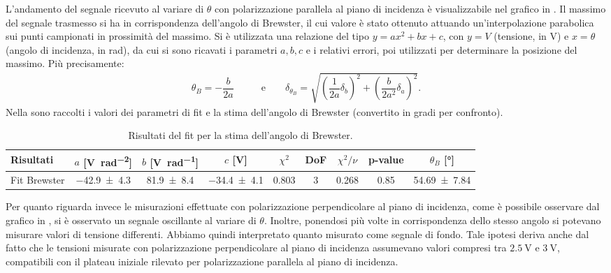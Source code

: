 \documentclass[a4paper]{article}
\begin{document}
L'andamento del segnale ricevuto al variare di $\theta$ con polarizzazione parallela al piano di incidenza è visualizzabile nel grafico in . Il massimo del segnale trasmesso si ha in corrispondenza dell'angolo di Brewster, il cui valore è stato ottenuto attuando un'interpolazione parabolica sui punti campionati in prossimità del massimo. Si è utilizzata una relazione del tipo $y = ax^2 + bx +c$, con $y=V$ (tensione, in \si{\volt}) e $x=\theta$ (angolo di incidenza, in \si{\radian}), da cui si sono ricavati i parametri $a, b, c$ e i relativi errori, poi utilizzati per determinare la posizione del massimo. Più precisamente:
\begin{align}
  \theta_{B} = -\dfrac{b}{2a} \qquad & \text{e}\qquad
  \delta_{\theta_{B}} = \sqrt{\left(\dfrac{1}{2a}\delta_b\right)^2 + \left(\dfrac{b}{2a^2}\delta_a\right)^2}. \label{eq:angolo_brewster_calc}
\end{align}
Nella  sono raccolti i valori dei parametri di fit e la stima dell'angolo di Brewster (convertito in gradi per confronto).
\begin{table}[htbp]
\centering
\caption{Risultati del fit per la stima dell'angolo di Brewster.}
\label{tab:fit_brewster}
\begin{tabular}{|l|cccccccc|}
\hline
Risultati & $a$ [\si{\volt\per\radian\squared}]& $b$ [\si{\volt\per\radian}]& $c$ [\si{\volt}]& $\chi^2$ & DoF & $\chi^2/\nu$ & p-value & $\theta_B$ [\si{\degree}]\\\hline\hline
Fit Brewster & \SI{-42.9 \pm 4.3}{} & \SI{81.9 \pm 8.4}{} & \SI{-34.4 \pm 4.1}{} & 0.803 & 3 & 0.268 & 0.85 & \SI{54.69 \pm 7.84}{} \\\hline
\end{tabular}
\end{table}
Per quanto riguarda invece le misurazioni effettuate con polarizzazione perpendicolare al piano di incidenza, come è possibile osservare dal grafico in , si è osservato un segnale oscillante al variare di $\theta$. Inoltre, ponendosi più volte in corrispondenza dello stesso angolo si potevano misurare valori di tensione differenti. Abbiamo quindi interpretato quanto misurato come segnale di fondo. Tale ipotesi deriva anche dal fatto che le tensioni misurate con polarizzazione perpendicolare al piano di incidenza assumevano valori compresi tra $\SI{2.5}{\volt}$ e $\SI{3}{\volt}$, compatibili con il plateau iniziale rilevato per polarizzazione parallela al piano di incidenza.
\end{document}
